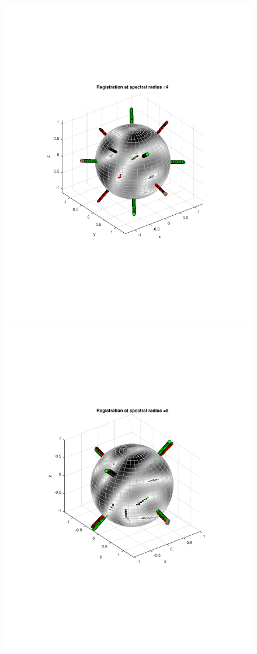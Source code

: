 \documentclass{UCF_ETD}
\begin{document}
\begin{figure}[H]
\begin{center}
\includegraphics[scale=0.32]{RobustRegistration/NoisyTransReg_4}
\includegraphics[scale=0.32]{RobustRegistration/NoisyTransReg_5}

\end{center}
\end{figure}
\end{document}
